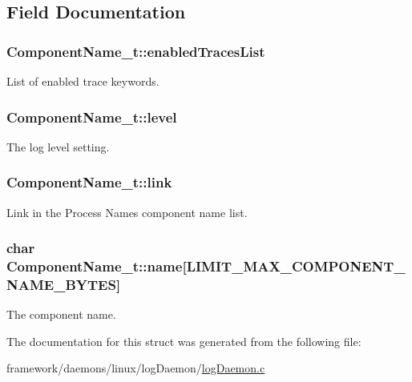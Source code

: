\subsection{Field Documentation}
\subsubsection[{\texorpdfstring{enabled\+Traces\+List}{enabledTracesList}}]{ Component\+Name\+\_\+t\+::enabled\+Traces\+List}\hypertarget{struct_component_name__t_abe19c50d5a16dd9d57cc5ea5e981b12f}{}\label{struct_component_name__t_abe19c50d5a16dd9d57cc5ea5e981b12f}


List of enabled trace keywords. 

\subsubsection[{\texorpdfstring{level}{level}}]{ Component\+Name\+\_\+t\+::level}\hypertarget{struct_component_name__t_a1b15de9df7ba984abeab37507796b2e2}{}\label{struct_component_name__t_a1b15de9df7ba984abeab37507796b2e2}


The log level setting. 

\subsubsection[{\texorpdfstring{link}{link}}]{ Component\+Name\+\_\+t\+::link}\hypertarget{struct_component_name__t_a0102a124b5184654591b941ef69678f7}{}\label{struct_component_name__t_a0102a124b5184654591b941ef69678f7}


Link in the Process Name\textquotesingle{}s component name list. 

\subsubsection[{\texorpdfstring{name}{name}}]{\setlength{\rightskip}{0pt plus 5cm}char Component\+Name\+\_\+t\+::name\mbox{[}{\bf L\+I\+M\+I\+T\+\_\+\+M\+A\+X\+\_\+\+C\+O\+M\+P\+O\+N\+E\+N\+T\+\_\+\+N\+A\+M\+E\+\_\+\+B\+Y\+T\+ES}\mbox{]}}\hypertarget{struct_component_name__t_a71c2766ed4b343c509bafd6764621412}{}\label{struct_component_name__t_a71c2766ed4b343c509bafd6764621412}


The component name. 



The documentation for this struct was generated from the following file\+:\begin{DoxyCompactItemize}
\item 
framework/daemons/linux/log\+Daemon/\hyperlink{log_daemon_8c}{log\+Daemon.\+c}\end{DoxyCompactItemize}
